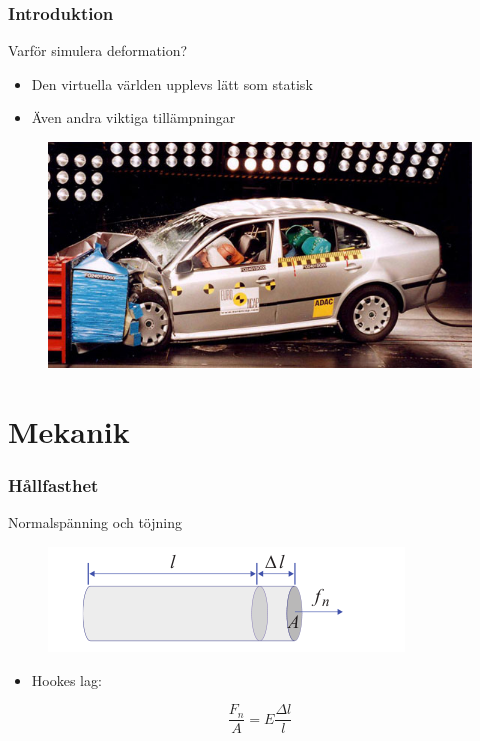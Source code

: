 \documentclass{beamer}
\begin{document}
\begin{frame}
\frametitle{Introduktion}
\begin{block}{Varför simulera deformation?}
\begin{itemize}
\item Den virtuella världen upplevs lätt som statisk
\item Även andra viktiga tillämpningar
\end{itemize}
\begin{figure}
\includegraphics[scale=0.3]{Skoda_Krocktest_27207.png} 
\end{figure}
\end{block}
\end{frame}

\section{Mekanik}
\begin{frame}
\frametitle{Hållfasthet}
\begin{block}{Normalspänning och töjning}
\begin{figure}
\includegraphics[scale=0.5]{a88-muller.png}
\end{figure}
\begin{itemize}
\item Hookes lag:
\end{itemize}
\begin{equation}
\frac{F_n}{A} = E \frac{\Delta l}{l}
\end{equation}
\end{block}
\end{frame}
\end{document}
